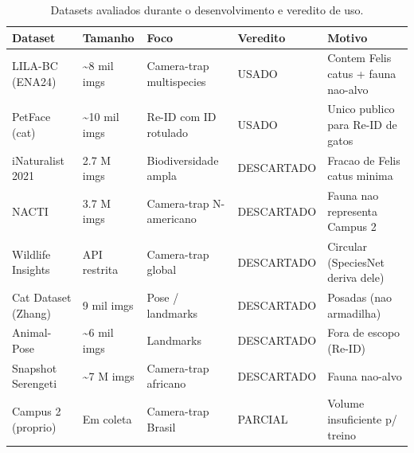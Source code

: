 \begin{table}[!htb]
\centering
\caption{Datasets avaliados durante o desenvolvimento e veredito de uso.}
\label{tab:datasets-avaliados}
\begin{tabular}{llllp{5cm}}
\toprule
Dataset & Tamanho & Foco & Veredito & Motivo \\
\midrule
LILA-BC (ENA24) & \textasciitilde{}8 mil imgs & Camera-trap multispecies & USADO & Contem Felis catus + fauna nao-alvo \\
PetFace (cat) & \textasciitilde{}10 mil imgs & Re-ID com ID rotulado & USADO & Unico publico para Re-ID de gatos \\
iNaturalist 2021 & 2.7 M imgs & Biodiversidade ampla & DESCARTADO & Fracao de Felis catus minima \\
NACTI & 3.7 M imgs & Camera-trap N-americano & DESCARTADO & Fauna nao representa Campus 2 \\
Wildlife Insights & API restrita & Camera-trap global & DESCARTADO & Circular (SpeciesNet deriva dele) \\
Cat Dataset (Zhang) & 9 mil imgs & Pose / landmarks & DESCARTADO & Posadas (nao armadilha) \\
Animal-Pose & \textasciitilde{}6 mil imgs & Landmarks & DESCARTADO & Fora de escopo (Re-ID) \\
Snapshot Serengeti & \textasciitilde{}7 M imgs & Camera-trap africano & DESCARTADO & Fauna nao-alvo \\
Campus 2 (proprio) & Em coleta & Camera-trap Brasil & PARCIAL & Volume insuficiente p/ treino \\
\bottomrule
\end{tabular}
\end{table}
